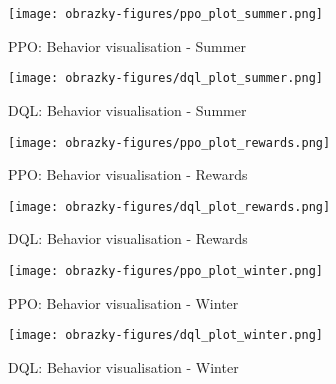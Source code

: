 \begin{figure}[ht]
    \centering
    \begin{minipage}{0.49\linewidth}
        \texttt{[image: obrazky-figures/ppo\_plot\_summer.png]}
        \caption{PPO: Behavior visualisation - Summer}
        \label{fig:ppo_summer}
    \end{minipage}\hfill
    \begin{minipage}{0.49\linewidth}
        \texttt{[image: obrazky-figures/dql\_plot\_summer.png]}
        \caption{DQL: Behavior visualisation - Summer}
        \label{fig:dql_summer}
    \end{minipage}
\end{figure}

\begin{figure}[ht]
    \centering
    \begin{minipage}{0.49\linewidth}
        \texttt{[image: obrazky-figures/ppo\_plot\_rewards.png]}
        \caption{PPO: Behavior visualisation - Rewards}
        \label{fig:ppo_rewards}
    \end{minipage}\hfill
    \begin{minipage}{0.49\linewidth}
        \texttt{[image: obrazky-figures/dql\_plot\_rewards.png]}
        \caption{DQL: Behavior visualisation - Rewards}
        \label{fig:dql_rewards}
    \end{minipage}
\end{figure}

\begin{figure}[ht]
    \centering
    \begin{minipage}{0.49\linewidth}
        \texttt{[image: obrazky-figures/ppo\_plot\_winter.png]}
        \caption{PPO: Behavior visualisation - Winter}
        \label{fig:ppo_winter}
    \end{minipage}\hfill
    \begin{minipage}{0.49\linewidth}
        \texttt{[image: obrazky-figures/dql\_plot\_winter.png]}
        \caption{DQL: Behavior visualisation - Winter}
        \label{fig:dql_winter}
    \end{minipage}
\end{figure}

